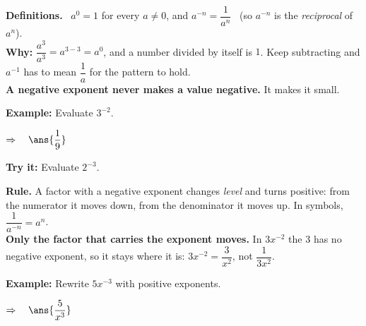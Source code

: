 \documentclass[12pt]{article}
\begin{document}


\begin{formulabox}
\textbf{Definitions.} \ $a^{0} = 1$ for every $a \neq 0$, \quad and \quad
$a^{-n} = \dfrac{1}{a^{n}}$ \ (so $a^{-n}$ is the \emph{reciprocal} of
$a^{n}$).\\[3pt]
\textbf{Why:} $\dfrac{a^{3}}{a^{3}} = a^{3-3} = a^{0}$, and a number divided
by itself is $1$. Keep subtracting and $a^{-1}$ has to mean $\dfrac{1}{a}$ for
the pattern to hold.\\[3pt]
\textbf{A negative exponent never makes a value negative.} It makes it small.
\end{formulabox}

\begin{examplebox}
\textbf{Example:} \quad Evaluate $3^{-2}$.

$\Rightarrow\quad \ans{\dfrac{1}{9}}$
\end{examplebox}

\begin{tryitbox}
\textbf{Try it:} \quad Evaluate $2^{-3}$.\\[2pt]
\end{tryitbox}


\begin{formulabox}
\textbf{Rule.} A factor with a negative exponent changes \emph{level} and
turns positive: from the numerator it moves down, from the denominator it
moves up. In symbols, $\dfrac{1}{a^{-n}} = a^{n}$.\\[3pt]
\textbf{Only the factor that carries the exponent moves.} In $3x^{-2}$ the
$3$ has no negative exponent, so it stays where it is:
$3x^{-2} = \dfrac{3}{x^{2}}$, not $\dfrac{1}{3x^{2}}$.
\end{formulabox}

\begin{examplebox}
\textbf{Example:} \quad Rewrite $5x^{-3}$ with positive exponents.

$\Rightarrow\quad \ans{\dfrac{5}{x^{3}}}$
\end{examplebox}
\end{document}
